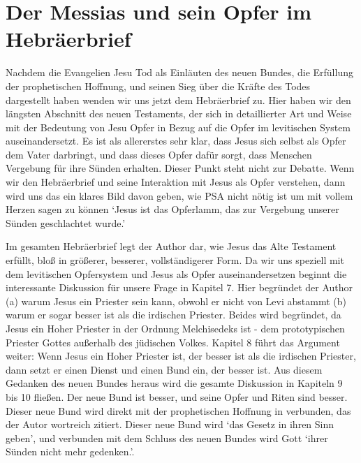 \chapter{\label{chap-hebrews}Der Messias und sein Opfer im Hebräerbrief}
Nachdem die Evangelien Jesu Tod als Einläuten des neuen Bundes, die Erfüllung der prophetischen Hoffnung, und seinen Sieg über die Kräfte des Todes dargestellt haben wenden wir uns jetzt dem Hebräerbrief zu.
Hier haben wir den längsten Abschnitt des neuen Testaments, der sich in detaillierter Art und Weise mit der Bedeutung von Jesu Opfer in Bezug auf die Opfer im levitischen System auseinandersetzt.
Es ist als allererstes sehr klar, dass Jesus sich selbst als Opfer dem Vater darbringt, und dass dieses Opfer dafür sorgt, dass Menschen Vergebung
für ihre Sünden erhalten. Dieser Punkt steht nicht zur Debatte.
Wenn wir den Hebräerbrief und seine Interaktion mit Jesus als Opfer verstehen, dann wird uns das ein klares Bild davon geben, wie PSA nicht nötig ist
um mit vollem Herzen sagen zu können `Jesus ist das Opferlamm, das zur Vergebung unserer Sünden geschlachtet wurde.'

Im gesamten Hebräerbrief legt der Author dar, wie Jesus das Alte Testament erfüllt, bloß in größerer, besserer, vollständigerer Form.
Da wir uns speziell mit dem levitischen Opfersystem und Jesus als Opfer auseinandersetzen beginnt die interessante Diskussion für unsere Frage in Kapitel 7.
Hier begründet der Author (a) warum Jesus ein Priester sein kann, obwohl er nicht von Levi abstammt (b) warum er sogar besser ist als die irdischen Priester.
Beides wird begründet, da Jesus ein Hoher Priester in der Ordnung Melchisedeks ist - dem prototypischen Priester Gottes außerhalb des jüdischen Volkes.
Kapitel 8 führt das Argument weiter: Wenn Jesus ein Hoher Priester ist, der besser ist als die irdischen Priester, dann setzt er einen Dienst und einen Bund ein, der besser ist.
Aus diesem Gedanken des neuen Bundes heraus wird die gesamte Diskussion in Kapiteln 9 bis 10 fließen.
Der neue Bund ist besser, und seine Opfer und Riten sind besser.
Dieser neue Bund wird direkt mit der prophetischen Hoffnung in  verbunden, das der Autor wortreich zitiert.
Dieser neue Bund wird `das Gesetz in ihren Sinn geben', und verbunden mit dem Schluss des neuen Bundes wird Gott `ihrer Sünden nicht mehr gedenken.'.

